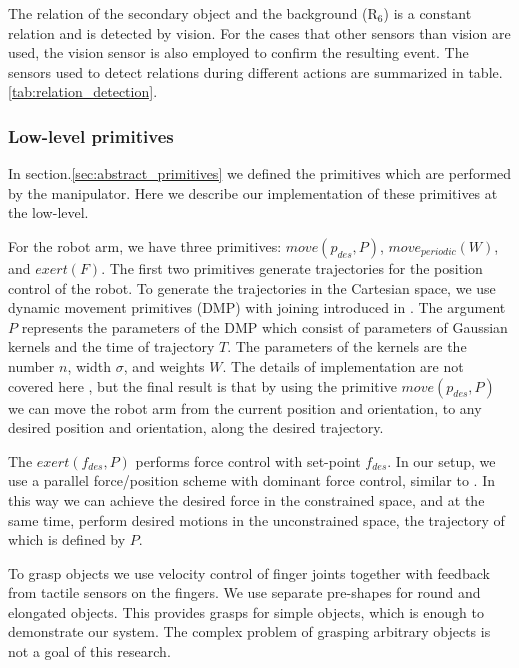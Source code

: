 The relation of the secondary object and the background ($\text{R}_6$) is a constant relation and is detected by vision.
For the cases that other sensors than vision are used, the vision sensor is also employed to confirm the resulting event.
The sensors used to detect relations during different actions are summarized in table.\ref{tab:relation_detection}.


\subsubsection{Low-level primitives}
\label{section_primitives}
In section.\ref{sec:abstract_primitives} we defined the primitives which are performed by the manipulator.
Here we describe our implementation of these primitives at the low-level.

For the robot arm, we have three primitives: $move(p_{des},P)$, $move_{periodic}(W)$, and $exert(F)$.
The first two primitives generate trajectories for the position control of the robot.
To generate the trajectories in the Cartesian space, we use dynamic movement primitives (DMP) with joining introduced in \cite{Kulvicius2012}.
The argument $P$ represents the parameters of the DMP which consist of parameters of Gaussian kernels and the time of trajectory $T$.
The parameters of the kernels are the number $n$, width $\sigma$, and weights $W$.
The details of implementation are not covered here , but the final result is that by using the primitive $move(p_{des},P)$
we can move the robot arm from the current position and orientation, to any desired position and orientation, along the desired trajectory.

The $exert(f_{des},P)$ performs force control with set-point $f_{des}$.
In our setup, we use a parallel force/position scheme with dominant force control, similar to \cite{chiaverini1993parallel}.
In this way we can achieve the desired force in the constrained space, and at the same time, perform desired motions in the unconstrained space,
the trajectory of which is defined by $P$.


To grasp objects we use velocity control of finger joints together with feedback from tactile sensors on the fingers.
We use separate pre-shapes for round and elongated objects.
This provides grasps for simple objects, which is enough to demonstrate our system.
The complex problem of grasping arbitrary objects is not a goal of this research.

